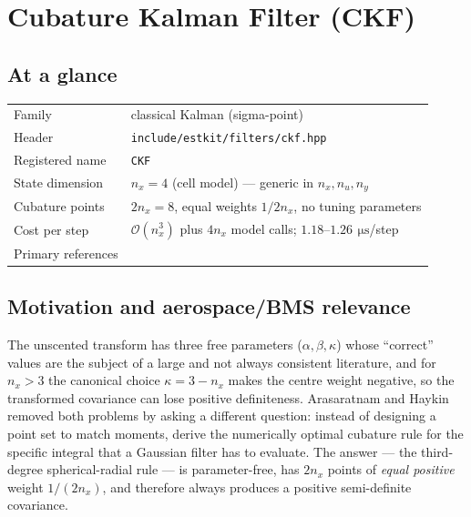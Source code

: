 \chapter{Cubature Kalman Filter (CKF)}
\label{ch:ckf}

\section*{At a glance}
\begin{tabular}{@{}l>{\raggedright\arraybackslash}p{}@{}}
Family & classical Kalman (sigma-point) \\
Header & \texttt{include/estkit/filters/ckf.hpp} \\
Registered name & \texttt{CKF} \\
State dimension & $n_x = 4$ (cell model) --- generic in $n_x, n_u, n_y$ \\
Cubature points & $2n_x = 8$, equal weights $1/2n_x$, no tuning parameters \\
Cost per step & $\mathcal{O}(n_x^3)$ plus $4n_x$ model calls; $1.18$--$1.26\,\SI{}{\micro\second}$/step \\
Primary references & \cite{arasaratnam2009ckf,ito2000gaussian,sarkka2013} \\
\end{tabular}

\section{Motivation and aerospace/BMS relevance}
The unscented transform has three free parameters ($\alpha,\beta,\kappa$) whose ``correct''
values are the subject of a large and not always consistent literature, and for $n_x>3$ the
canonical choice $\kappa = 3-n_x$ makes the centre weight negative, so the transformed
covariance can lose positive definiteness. Arasaratnam and Haykin~\cite{arasaratnam2009ckf}
removed both problems by asking a different question: instead of designing a point set to
match moments, derive the numerically optimal cubature rule for the specific integral that a
Gaussian filter has to evaluate. The answer --- the third-degree spherical-radial rule --- is
parameter-free, has $2n_x$ points of \emph{equal positive} weight $1/(2n_x)$, and therefore
always produces a positive semi-definite covariance.

